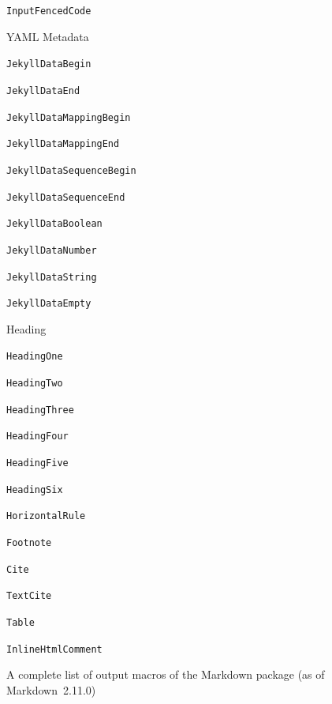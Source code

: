 \documentclass[
  digital,     %
  oneside,     %
  nosansbold,  %
  nocolorbold, %
  lof,         %
  nolot,       %
]{fithesis4}
\begin{document}
\begin{figure}
\begin{multicols}{2}
\begin{compactenum}
\begin{compactenum}
        \item \texttt{InputFencedCode}
      \end{compactenum}
      \item YAML Metadata
      \begin{compactenum}  %
        \item \texttt{JekyllDataBegin}
        \item \texttt{JekyllDataEnd}
        \item \texttt{JekyllDataMappingBegin}
        \item \texttt{JekyllDataMappingEnd}
        \item \texttt{JekyllDataSequenceBegin}
        \item \texttt{JekyllDataSequenceEnd}
        \item \texttt{JekyllDataBoolean}
        \item \texttt{JekyllDataNumber}
        \item \texttt{JekyllDataString}
        \item \texttt{JekyllDataEmpty}
      \end{compactenum}
      \item Heading
      \begin{compactenum}
        \item \texttt{HeadingOne}
        \item \texttt{HeadingTwo}
        \item \texttt{HeadingThree}
        \item \texttt{HeadingFour}
        \item \texttt{HeadingFive}
        \item \texttt{HeadingSix}
      \end{compactenum}
      \item \texttt{HorizontalRule}
      \item \texttt{Footnote}
      \item \texttt{Cite}
      \item \texttt{TextCite}
      \item \texttt{Table}
      \item \texttt{InlineHtmlComment}
    \end{compactenum}
  \end{multicols}
  \vspace*{-1em}
  \caption{A complete list of output macros of the Markdown package (as of Markdown~2.11.0)}
  \label{fig:markdown-renderers}
\end{figure}
\end{document}
